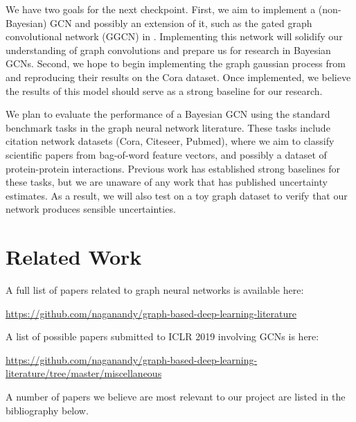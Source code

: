 \documentclass[11pt,letterpaper]{article}
\begin{document}
We have two goals for the next checkpoint. First, we aim to implement a (non-Bayesian) GCN \citep{gcn_nips15, gcniclr17} and possibly an extension of it, such as the gated graph convolutional network (GGCN) in \citet{ggnn_iclr16}. Implementing this network will solidify our understanding of graph convolutions and prepare us for research in Bayesian GCNs. Second, we hope to begin implementing the graph gaussian process from \citet{ng2018bayesian} and reproducing their results on the Cora dataset. Once implemented, we believe the results of this model should serve as a strong baseline for our research.

We plan to evaluate the performance of a Bayesian GCN using the standard benchmark tasks in the graph neural network literature. These tasks include citation network datasets (Cora, Citeseer, Pubmed), where we aim to classify scientific papers from bag-of-word feature vectors, and possibly a dataset of protein-protein interactions. Previous work has established strong baselines for these tasks, but we are unaware of any work that has published uncertainty estimates. As a result, we will also test on a toy graph dataset to verify that our network produces sensible uncertainties. 






\section*{Related Work}

A full list of papers related to graph neural networks is available here:

\url{https://github.com/naganandy/graph-based-deep-learning-literature}

A list of possible papers submitted to ICLR 2019 involving GCNs is here: 

\url{https://github.com/naganandy/graph-based-deep-learning-literature/tree/master/miscellaneous}

A number of papers we believe are most relevant to our project are listed in the bibliography below.  

\nocite{*}



\newpage
\end{document}
